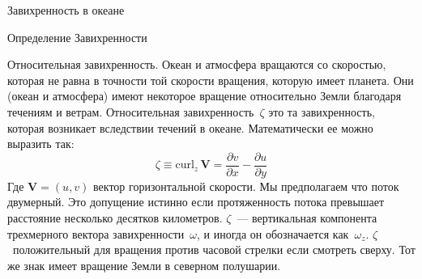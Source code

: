 \begin{chapter}{Завихренность в океане}
\begin{section}{Определение Завихренности}
\begin{paragraph}{Относительная завихренность.}
Океан и атмосфера вращаются со скоростью, которая не равна в точности
той скорости вращения, которую имеет планета. Они (океан и атмосфера)
имеют некоторое вращение относительно Земли благодаря течениям и
ветрам. Относительная завихренность~$\zeta$ это та завихренность, которая
возникает вследствии течений в океане. Математически ее можно выразить
так:
\begin{equation}
\boxed{ \zeta \equiv \text{curl}_z\, \textbf{V} =
\frac{\partial{v}}{\partial{x}}-\frac{\partial{u}}{\partial{y}} }
\end{equation}
Где $\textbf{V} = (u, v)$ вектор горизонтальной скорости. Мы
предполагаем что поток двумерный. Это допущение истинно если
протяженность потока превышает расстояние несколько десятков
километров. $\zeta $~--- вертикальная компонента трехмерного вектора
завихренности~$\omega$, и иногда он обозначается как~$\omega{_z}$.
$\zeta$~положительный для вращения против часовой стрелки если
смотреть сверху. Тот же знак имеет вращение Земли в северном
полушарии.
%


\end{paragraph}
\end{section}
\end{chapter}
